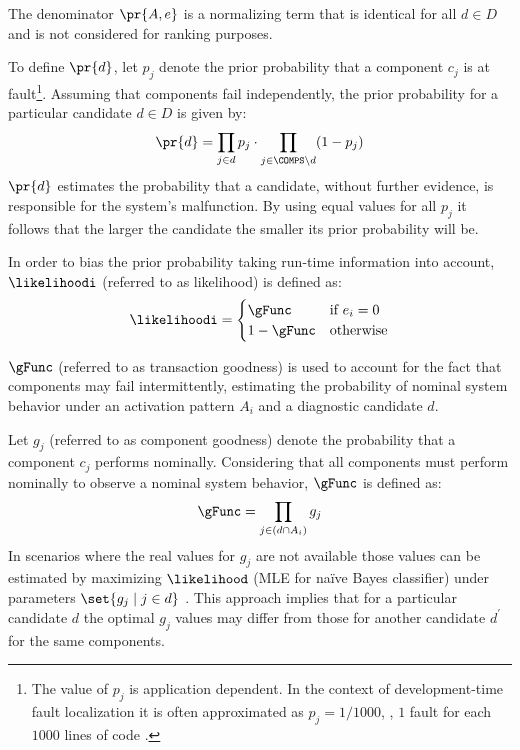 %
The denominator $\pr{A, e}$ is a normalizing term that is identical
for all $d \in D$ and is not considered for ranking purposes.

To define $\pr{d}$, let $p_j$ denote the prior probability that a
component $c_j$ is at fault\footnote{The value of $p_j$ is application
  dependent. In the context of development-time fault localization it
  is often approximated as $p_j = 1/1000$, \ie, $1$ fault for each
  $1000$ lines of code \cite{Carey99}.}.
%
Assuming that components fail independently, the prior
probability for a particular candidate $d \in D$ is given by:
\begin{equation}
  \pr{d} = \prod_{j \in d} p_j \cdot \prod_{j \in \COMPS \setminus d} (1 - p_j)
\end{equation}
%
$\pr{d}$ estimates the probability that a candidate, without further
evidence, is responsible for the system's malfunction.
%
By using equal values for all $p_j$
it follows that the larger the candidate the smaller its prior
probability will be.


In order to bias the prior probability taking run-time information
into account, $\likelihoodi$ (referred to as likelihood) is
defined as:
\begin{equation}
  \label{eq:intro:likelihood-func}
  \likelihoodi =
  \begin{cases}
    \gFunc     & \textrm{if   } e_i = 0 \\
    1 - \gFunc & \textrm{otherwise}
  \end{cases}
\end{equation}

\noindent $\gFunc$ (referred to as transaction goodness) is used to
account for the fact that components may fail intermittently,
estimating the probability of nominal system behavior under an
activation pattern $A_i$ and a diagnostic candidate $d$.


Let $g_j$ (referred to as component goodness) denote the probability
that a component $c_j$ performs nominally.
%
Considering that all components must perform nominally to observe a
nominal system behavior, $\gFunc$ is defined as:
\begin{equation}
  \label{eq:intro:g-func}
  \gFunc = \displaystyle\prod_{j \in (d \cap A_i)} g_j
\end{equation}
\noindent In scenarios where the real values for $g_j$ are not
available those values can be estimated by maximizing $\likelihood$
(\ac{MLE} for na\"{i}ve Bayes classifier) under parameters
$\set{ g_j \mid j \in d }$ \cite{Abreu09a}.
%
This approach implies that for a particular candidate $d$ the optimal
$g_j$ values may differ from those for another candidate $d^\prime$
for the same components.

